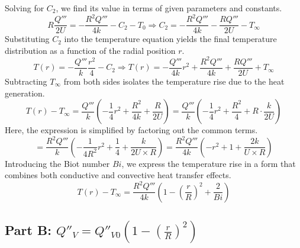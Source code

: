 \documentclass{article}
\numberwithin{equation}{section}
\begin{document}
\noindent
Solving for \( C_{2} \), we find its value in terms of given parameters and constants.
\begin{equation}
R\frac{Q'''}{2U} = -\frac{R^{2}Q'''}{4k} - C_{2} - T_{0} \Rightarrow C_{2} = -\frac{R^{2}Q'''}{4k} - \frac{RQ'''}{2U} - T_{\infty}
\end{equation}
\noindent
Substituting \( C_{2} \) into the temperature equation yields the final temperature distribution as a function of the radial position \( r \).
\begin{equation}
T(r) = -\frac{Q'''}{k} \frac{r^{2}}{4} - C_{2} \Rightarrow T(r) = -\frac{Q'''}{4k} r^{2} + \frac{R^{2}Q'''}{4k} + \frac{RQ'''}{2U} + T_{\infty}
\end{equation}
\noindent
Subtracting \( T_{\infty} \) from both sides isolates the temperature rise due to the heat generation.
\begin{equation}
T(r) - T_{\infty} = \frac{Q'''}{k} \left( -\frac{1}{4} r^{2} + \frac{R^{2}}{4k} + \frac{R}{2U} \right) = \frac{Q'''}{k} \left( -\frac{1}{4} r^{2} + \frac{R^{2}}{4} + R \cdot \frac{k}{2U} \right)
\end{equation}
\noindent
Here, the expression is simplified by factoring out the common terms.
\begin{equation}
= \frac{R^{2}Q'''}{k} \left( -\frac{1}{4R^{2}} r^{2} + \frac{1}{4} + \frac{k}{2U \times R} \right) = \frac{R^{2}Q'''}{4k} \left( -r^{2} + 1 + \frac{2k}{U \times R} \right)
\end{equation}
\noindent
Introducing the Biot number \( Bi \), we express the temperature rise in a form that combines both conductive and convective heat transfer effects.
\begin{equation}
T(r) - T_{\infty} = \frac{R^{2}Q'''}{4k} \left( 1 - \left( \frac{r}{R} \right)^{2} + \frac{2}{Bi} \right)
\end{equation}





\subsection*{Part B: \( Q''_V = Q''_{V0} \left(1 - \left(\frac{r}{R}\right)^2\right) \)}
\end{document}
